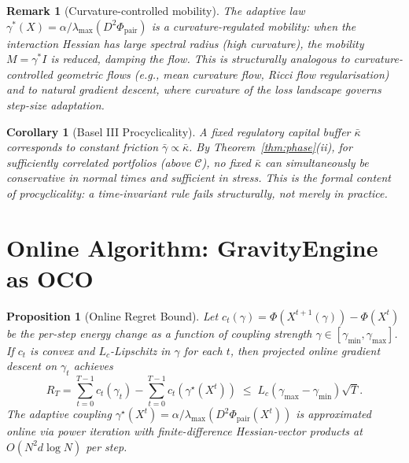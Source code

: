 \documentclass[11pt]{article}
\newtheorem{proposition}[theorem]{Proposition}
\newtheorem{corollary}[theorem]{Corollary}
\newtheorem{remark}[theorem]{Remark}
\theoremstyle{definition}
\newcommand{\Cman}{\mathcal{C}}
\newcommand{\lmax}{\lambda_{\max}}
\begin{document}

\begin{remark}[Curvature-controlled mobility]
\label{rem:curvature}
The adaptive law $\gamma^*(X) = \alpha/\lmax(D^2\Phi_{\mathrm{pair}})$ is a
curvature-regulated mobility: when the interaction Hessian has large spectral
radius (high curvature), the mobility $M = \gamma^* I$ is reduced, damping
the flow.  This is structurally analogous to curvature-controlled geometric
flows (e.g., mean curvature flow, Ricci flow regularisation) and to natural
gradient descent, where curvature of the loss landscape governs step-size
adaptation.
\end{remark}

\begin{corollary}[Basel III Procyclicality]
\label{cor:procyclical}
A fixed regulatory capital buffer $\bar\kappa$ corresponds to constant friction
$\bar\gamma \propto \bar\kappa$.  By Theorem~\ref{thm:phase}(ii), for sufficiently
correlated portfolios (above $\Cman$), no fixed $\bar\kappa$ can simultaneously
be conservative in normal times and sufficient in stress.  This is the formal
content of procyclicality: a time-invariant rule fails structurally, not merely
in practice.
\end{corollary}

\section{Online Algorithm: GravityEngine as OCO}
\label{sec:online}


\begin{proposition}[Online Regret Bound]
\label{prop:cs1}
Let $c_t(\gamma) = \Phi(X^{t+1}(\gamma)) - \Phi(X^t)$ be the per-step energy
change as a function of coupling strength $\gamma \in [\gamma_{\min},\gamma_{\max}]$.
If $c_t$ is convex and $L_c$-Lipschitz in $\gamma$ for each $t$, then projected
online gradient descent on $\gamma_t$ achieves
\[
  R_T = \sum_{t=0}^{T-1}c_t(\gamma_t) - \sum_{t=0}^{T-1}c_t(\gamma^\star(X^t))
  \;\le\; L_c(\gamma_{\max}-\gamma_{\min})\sqrt{T}.
\]
The adaptive coupling $\gamma^\star(X^t) = \alpha/\lmax(D^2\Phi_{\mathrm{pair}}(X^t))$
is approximated online via power iteration with finite-difference Hessian-vector
products at $O(N^2 d \log N)$ per step.
\end{proposition}
\end{document}
